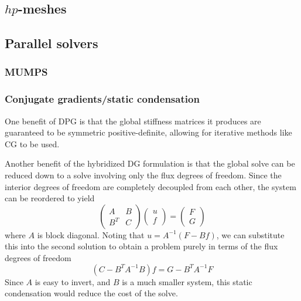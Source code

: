 \documentclass{article}
\begin{document}
\subsection{$hp$-meshes}
\subsection{Parallel solvers}
\subsubsection{MUMPS}

\subsubsection{Conjugate gradients/static condensation}

One benefit of DPG is that the global stiffness matrices it produces are guaranteed to be symmetric positive-definite, allowing for iterative methods like CG to be used. 

Another benefit of the hybridized DG formulation is that the global solve can be reduced down to a solve involving only the flux degrees of freedom. Since the interior degrees of freedom are completely decoupled from each other, the system can be reordered to yield 
\[
\left(\begin{array}{cc}
A &B\\
B^T &C
\end{array}
\right)
\left(\begin{array}{c}
u\\
f
\end{array}
\right) = 
\left(\begin{array}{c}
F\\
G
\end{array}
\right)
\]
where $A$ is block diagonal. Noting that $u = A^{-1}(F-Bf)$, we can substitute this into the second solution to obtain a problem purely in terms of the flux degrees of freedom
\[
(C-B^TA^{-1}B)f = G-B^TA^{-1}F
\]
Since $A$ is easy to invert, and $B$ is a much smaller system, this static condensation would reduce the cost of the solve.



\end{document}
